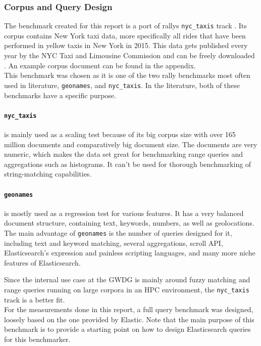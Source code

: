 \subsubsection{Corpus and Query Design}
The benchmark created for this report is a port of rallys \texttt{nyc\_taxis} track \cite{nyctaxis}. Its corpus contains New York taxi data, more specifically all rides that have been performed in yellow taxis in New York in 2015. This data gets published every year by the NYC Taxi and Limousine Commission and can be freely downloaded \cite{tlcdata}. An example corpus document can be found in the appendix.\\

This benchmark was chosen as it is one of the two rally benchmarks most often used in literature, \texttt{geonames}, and \texttt{nyc\_taxis}. In the literature, both of these benchmarks have a specific purpose. 

\paragraph{\texttt{nyc\_taxis}} is mainly used as a scaling test because of its big corpus size with over 165 million documents and comparatively big document size. The documents are very numeric, which makes the data set great for benchmarking range queries and aggregations such as histograms. It can't be used for thorough benchmarking of string-matching capabilities.

\paragraph{\texttt{geonames}} is mostly used as a regression test for various features. It has a very balanced document structure, containing text, keywords, numbers, as well as geolocations. The main advantage of \texttt{geonames} is the number of queries designed for it, including text and keyword matching, several aggregations, scroll API, Elasticsearch's expression and painless scripting languages, and many more niche features of Elasticsearch.

Since the internal use case at the GWDG is mainly around fuzzy matching and range queries running on large corpora in an \ac{HPC} environment, the \texttt{nyc\_taxis} track is a better fit.\\


For the measurements done in this report, a full query benchmark was designed, loosely based on the one provided by Elastic. Note that the main purpose of this benchmark is to provide a starting point on how to design Elasticsearch queries for this benchmarker. 

